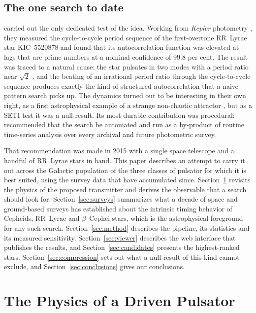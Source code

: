 \documentclass[final,5p]{elsarticle}
\newcommand{\bcep}{\ensuremath{\beta}~Cephei}
\begin{document}
\subsection{The one search to date}
\label{sec:hippke}

\citet{Hippke2015} carried out the only dedicated test of the idea. Working from \emph{Kepler} photometry \citep{Borucki2010}, they measured the cycle-to-cycle period sequence of the first-overtone RR~Lyrae star KIC~5520878 and found that its autocorrelation function was elevated at lags that are prime numbers at a nominal confidence of 99.8 per cent. The result was traced to a natural cause: the star pulsates in two modes with a period ratio near $\sqrt{2}$ \citep{Hippke2014sqrt2}, and the beating of an irrational period ratio through the cycle-to-cycle sequence produces exactly the kind of structured autocorrelation that a naive pattern search picks up. The dynamics turned out to be interesting in their own right, as a first astrophysical example of a strange non-chaotic attractor \citep{Lindner2015}, but as a SETI test it was a null result. Its most durable contribution was procedural: \citet{Hippke2015} recommended that the search be automated and run as a by-product of routine time-series analysis over every archival and future photometric survey.

That recommendation was made in 2015 with a single space telescope and a handful of RR~Lyrae stars in hand. This paper describes an attempt to carry it out across the Galactic population of the three classes of pulsator for which it is best suited, using the survey data that have accumulated since. Section~\ref{sec:physics} revisits the physics of the proposed transmitter and derives the observable that a search should look for. Section~\ref{sec:surveys} summarizes what a decade of space and ground-based surveys has established about the intrinsic timing behavior of Cepheids, RR~Lyrae and \bcep{} stars, which is the astrophysical foreground for any such search. Section~\ref{sec:method} describes the pipeline, its statistics and its measured sensitivity. Section~\ref{sec:viewer} describes the web interface that publishes the results, and Section~\ref{sec:candidates} presents the highest-ranked stars. Section~\ref{sec:compression} sets out what a null result of this kind cannot exclude, and Section~\ref{sec:conclusions} gives our conclusions.

\section{The Physics of a Driven Pulsator}
\label{sec:physics}
\end{document}
